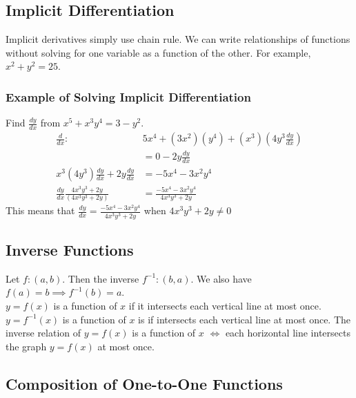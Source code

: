 \documentclass{article}
\begin{document}
\subsection{Implicit Differentiation}
Implicit derivatives simply use chain rule. We can write relationships of functions without solving for one variable as a function of the other. For example, $x^2 + y^2 = 25$.
\subsubsection{Example of Solving Implicit Differentiation}
Find $\frac{dy}{dx}$ from $x^5 + x^3y^4 = 3 - y^2$.
\begin{align*}
    \frac{d}{dx}: & 5x^4 + (3x^2)(y^4) + (x^3)(4y^3 \frac{dy}{dx})\\
    & = 0 - 2y \frac{dy}{dx}\\
    x^3(4y^3) \frac{dy}{dx} + 2y \frac{dy}{dx} & = -5x^4 - 3x^2y^4\\
    \frac{dy}{dx} \frac{4x^3y^3 + 2y}{(4x^3y^3 + 2y)} & = \frac{-5x^4 - 3x^2 y^4}{4x^3 y^3 + 2y}
\end{align*}
This means that $\frac{dy}{dx} = \frac{-5x^4 - 3x^2 y^4}{4x^3 y^3 + 2y}$ when $4x^3y^3 + 2y \neq 0$ 

\subsection{Inverse Functions}
Let $f:(a,b)$. Then the inverse $f^{-1}: (b, a)$. We also have $f(a) = b \implies f^{-1}(b) = a$.\\
$y = f(x)$ is a function of $x$ if it intersects each vertical line at most once. 
$y = f^{-1}(x)$ is a function of $x$ is if intersects each vertical line at most once.
The inverse relation of $y = f(x)$ is a function of $x$ $\iff$ each horizontal line intersects the graph $y = f(x)$ at most once.

\subsection{Composition of One-to-One Functions}
\end{document}

